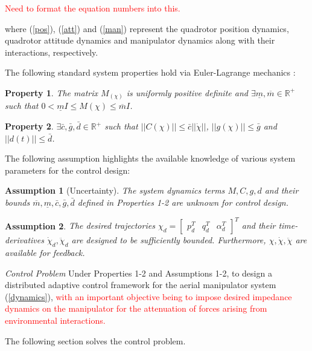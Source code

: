 \documentclass[letterpaper, 10 pt, conference]{ieeeconf}  %
\newtheorem{assum}{Assumption}
\newtheorem{property}{Property}
\begin{document}
\textcolor{red}{Need to format the equation numbers into this.}

where (\ref{pos}), (\ref{att}) and (\ref{man}) represent the quadrotor position dynamics, quadrotor attitude dynamics and manipulator dynamics along with their interactions, respectively. 

The following standard system properties hold via Euler-Lagrange mechanics \cite{spong2008robot}:
\begin{property} \label{prop_1}
The matrix {$M_(\chi)$} is uniformly positive definite and $ \exists \underline{m},\overline{m} \in \mathbb{R}^{+}$ such that $0 < \underline{m} I \leq M(\chi) \leq \overline{m} I$. 
\end{property}

\begin{property} \label{prop_3}
$\exists \bar{c}, \bar{g}, \bar{d} \in\mathbb{R}^{+}$ such that $||C (\chi)|| \leq \bar{c}||\dot{\chi}||$, $||g (\chi)|| \leq \bar{g}$ and $||d(t)|| \leq \bar{d}$. %
\end{property}

The following assumption highlights the available knowledge of various system parameters for the control design:

\begin{assum}[Uncertainty] \label{assum_1}
The system dynamics terms $M, C, g, d$
and their bounds $\overline{m}, \underline{m}, \bar{c}, \bar{g}, \bar{d}$ defined in Properties 1-2 are unknown for control design.
\end{assum}

\begin{assum} \label{assum_2}
The desired trajectories $\chi_d = \begin{bmatrix} p_d^T & q_d^T & \alpha_d^T\end{bmatrix}^T$ and their time-derivatives $\dot{\chi}_d, \ddot{\chi}_d$ are designed to
be sufficiently bounded. Furthermore, $\chi, \dot{\chi}, \ddot{\chi}$ are available for feedback.
\end{assum}


\textit{Control Problem} Under Properties 1-2 and Assumptions 1-2, to design a distributed adaptive control framework for the aerial manipulator system (\ref{dynamics}), \textcolor{red}{with an important objective being to impose desired impedance dynamics on the manipulator for the attenuation of forces arising from environmental interactions.}

The following section solves the control problem.
\end{document}
